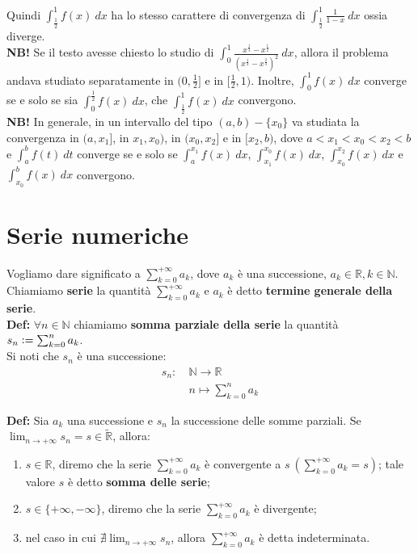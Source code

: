 \documentclass{article}
\begin{document}
\noindent Quindi $\int_\frac{1}{2}^1 f(x) \ dx$ ha lo stesso carattere di convergenza di $\int_\frac{1}{2}^1 \frac{1}{1 - x} \ dx$ ossia diverge.\\

\noindent\textbf{NB!} Se il testo avesse chiesto lo studio di $\int_0^1 \frac{x^{\frac{1}{3}} - x^{\frac{1}{2}}}{(x^{\frac{1}{2}} - x^{\frac{2}{3}})^2} \ dx$, allora il problema andava studiato separatamente in $(0, \frac{1}{2}]$ e in $[\frac{1}{2}, 1)$. Inoltre, $\int_0^1 f(x) \ dx$ converge se e solo se sia $\int_0^\frac{1}{2} f(x) \ dx$, che $\int_\frac{1}{2}^1 f(x) \ dx$ convergono. \\

\noindent\textbf{NB!} In generale, in un intervallo del tipo $(a, b) - \{x_0\}$ va studiata la convergenza in $(a, x_1]$, in $x_1, x_0)$, in $(x_0, x_2]$ e in $[x_2, b)$, dove $a < x_1 < x_0 < x_2 < b$ e $\int_a^b f(t) \ dt$ converge se e solo se $\int_a^{x_1} f(x) \ dx$, $\int_{x_1}^{x_0} f(x) \ dx$, $\int_{x_0}^{x_2} f(x) \ dx$ e $\int_{x_0}^b f(x) \ dx$ convergono.

\newpage
\part{Serie numeriche}
Vogliamo dare significato a $\sum_{k = 0}^{+\infty} a_k$, dove $a_k$ è una successione, $a_k \in \mathbb{R}, k \in \mathbb{N}$. Chiamiamo \textbf{serie} la quantità $\sum_{k = 0}^{+\infty} a_k$ e $a_k$ è detto \textbf{termine generale della serie}. \\

\noindent\textbf{Def:} $\forall n \in \mathbb{N}$ chiamiamo \textbf{somma parziale della serie} la quantità $s_n \vcentcolon = \sum_{k = 0}^n a_k$.\\
Si noti che $s_n$ è una successione:
\begin{align*}
    s_n: \ & \mathbb{N} \xrightarrow{} \mathbb{R} \\
    & n \longmapsto \sum_{k = 0}^n a_k
\end{align*}

\noindent\textbf{Def:} Sia $a_k$ una successione e $s_n$ la successione delle somme parziali. Se $\lim_{n \to +\infty} s_n = s \in \widetilde{\mathbb{R}}$, allora:
\begin{enumerate}
    \item $s \in \mathbb{R}$, diremo che la serie $\sum_{k = 0}^{+ \infty} a_k$ è convergente a $s \ (\sum_{k = 0}^{+\infty} a_k = s)$; tale valore $s$ è detto \textbf{somma delle serie};
    \item $s \in \{+\infty, -\infty\}$, diremo che la serie $\sum_{k = 0}^{+\infty} a_k$ è divergente;
    \item nel caso in cui $\nexists \lim_{n \to +\infty} s_n$, allora $\sum_{k = 0}^{+\infty} a_k$ è detta indeterminata.
\end{enumerate}
\end{document}
